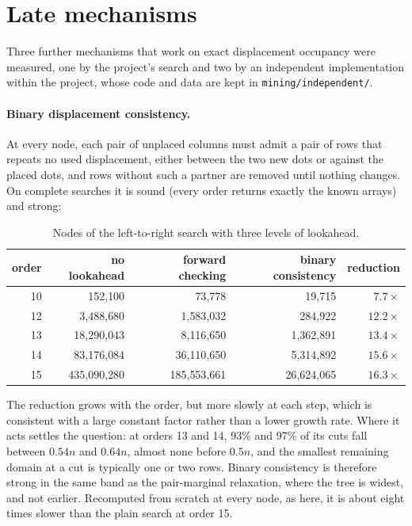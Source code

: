 \section{Late mechanisms}
\label{sec:late}
Three further mechanisms that work on exact displacement occupancy were measured, one by the project's
search and two by an independent implementation within the project, whose code and data are kept in
\texttt{mining/independent/}.

\paragraph{Binary displacement consistency.} At every node, each pair of unplaced columns must admit a pair
of rows that repeats no used displacement, either between the two new dots or against the placed dots,
and rows without such a partner are removed until nothing changes. On complete searches it is sound (every
order returns exactly the known arrays) and strong:

\begin{table}[H]
\centering
\small
\begin{tabular}{@{}rrrrr@{}}
\toprule
order & no lookahead & forward checking & binary consistency & reduction \\
\midrule
10 & 152{,}100 & 73{,}778 & 19{,}715 & $7.7\times$ \\
12 & 3{,}488{,}680 & 1{,}583{,}032 & 284{,}922 & $12.2\times$ \\
13 & 18{,}290{,}043 & 8{,}116{,}650 & 1{,}362{,}891 & $13.4\times$ \\
14 & 83{,}176{,}084 & 36{,}110{,}650 & 5{,}314{,}892 & $15.6\times$ \\
15 & 435{,}090{,}280 & 185{,}553{,}661 & 26{,}624{,}065 & $16.3\times$ \\
\bottomrule
\end{tabular}
\caption{Nodes of the left-to-right search with three levels of lookahead.}
\label{tab:binac}
\end{table}

\noindent The reduction grows with the order, but more slowly at each step, which is consistent with a large
constant factor rather than a lower growth rate. Where it acts settles the question: at orders 13 and 14,
93\% and 97\% of its cuts fall between $0.54n$ and $0.64n$, almost none before $0.5n$, and the smallest
remaining domain at a cut is typically one or two rows. Binary consistency is therefore strong in the
same band as the pair-marginal relaxation, where the tree is widest, and not earlier. Recomputed from
scratch at every node, as here, it is about eight times slower than the plain search at order 15.

